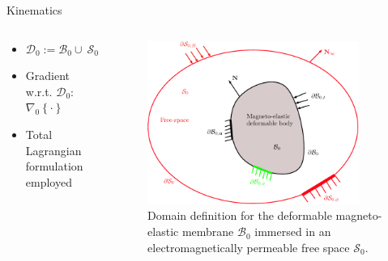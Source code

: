 \documentclass{beamer}
\begin{document}
\begin{frame}{Kinematics}
\begin{columns}
\begin{column}{0.4\textwidth}
\begin{itemize}
\item $\mathcal{D}_0 := \mathcal{B}_0 \cup \ \mathcal{S}_0$
\item Gradient w.r.t. $\mathcal{D}_0$: $\nabla_0 \left\lbrace \cdot \right\rbrace$
\item Total Lagrangian formulation employed
\end{itemize}
\end{column}
\begin{column}{0.59\textwidth}
\begin{figure}[h]
\centering
\includegraphics[width=0.9\textwidth]{kinematics_potato_coupled.pdf}
\caption{Domain definition for the deformable magneto-elastic membrane $\mathcal{B}_0$ immersed in an electromagnetically permeable free space $\mathcal{S}_0$.}
\end{figure}
\end{column}
\end{columns}
\end{frame}
\end{document}
